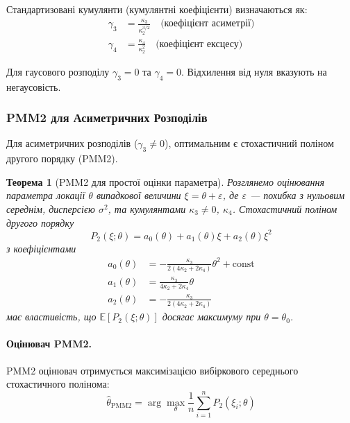 \documentclass[12pt,a4paper]{article}
\newtheorem{theorem}{Теорема}[section]
\begin{document}
	Стандартизовані кумулянти (кумулянтні коефіцієнти) визначаються як:
	\begin{align}
		\gamma_3 &= \frac{\kappa_3}{\kappa_2^{3/2}} \quad \text{(коефіцієнт асиметрії)} \label{eq:skewness} \\
		\gamma_4 &= \frac{\kappa_4}{\kappa_2^{2}} \quad \text{(коефіцієнт ексцесу)} \label{eq:kurtosis}
	\end{align}
	
	Для гаусового розподілу $\gamma_3 = 0$ та $\gamma_4 = 0$. Відхилення від нуля вказують на негаусовість.
	
	\subsubsection{PMM2 для Асиметричних Розподілів}
	
	Для асиметричних розподілів ($\gamma_3 \neq 0$), оптимальним є стохастичний поліном другого порядку (PMM2).
	
	\begin{theorem}[PMM2 для простої оцінки параметра]
		\label{thm:pmm2_basic}
		Розглянемо оцінювання параметра локації $\theta$ випадкової величини $\xi = \theta + \varepsilon$, де $\varepsilon$ --- похибка з нульовим середнім, дисперсією $\sigma^2$, та кумулянтами $\kappa_3 \neq 0$, $\kappa_4$. Стохастичний поліном другого порядку
		\begin{equation}
			\label{eq:pmm2_polynomial}
			P_2(\xi; \theta) = a_0(\theta) + a_1(\theta) \xi + a_2(\theta) \xi^2
		\end{equation}
		з коефіцієнтами
		\begin{align}
			a_0(\theta) &= -\frac{\kappa_3}{2(4\kappa_2 + 2\kappa_4)} \theta^2 + \text{const} \label{eq:a0} \\
			a_1(\theta) &= \frac{\kappa_3}{4\kappa_2 + 2\kappa_4} \theta \label{eq:a1} \\
			a_2(\theta) &= -\frac{\kappa_3}{2(4\kappa_2 + 2\kappa_4)} \label{eq:a2}
		\end{align}
		має властивість, що $\mathbb{E}[P_2(\xi; \theta)]$ досягає максимуму при $\theta = \theta_0$.
	\end{theorem}
	
	\paragraph{Оцінювач PMM2.}
	
	PMM2 оцінювач отримується максимізацією вибіркового середнього стохастичного полінома:
	\begin{equation}
		\label{eq:pmm2_estimator}
		\hat{\theta}_{\text{PMM2}} = \arg\max_{\theta} \frac{1}{n} \sum_{i=1}^{n} P_2(\xi_i; \theta)
	\end{equation}
	
\end{document}
